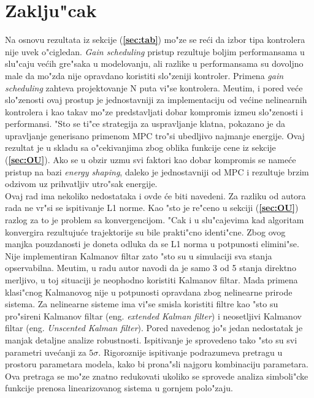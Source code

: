 \documentclass[a4paper,11pt]{article}
\theoremstyle{definition} \newtheorem{deff}{Definicija}[section]
\theoremstyle{definition} \newtheorem{prim}[deff]{Primer}
\theoremstyle{plain} \newtheorem{teor}[deff]{Teorema}
\begin{document}
	
	\clearpage
	\section{Zaklju"cak}\label{sec:zakljucak}
	
	Na osnovu rezultata iz sekcije (\textbf{\ref{sec:tab}}) mo"ze se re\'ci da  izbor tipa kontrolera nije uvek o"cigledan. \emph{Gain scheduling} pristup rezultuje boljim performansama u slu"caju ve\'cih gre"saka u modelovanju, ali razlike u performansama su dovoljno male da mo"zda nije opravdano koristiti slo"zeniji kontroler. Primena 
	\emph{gain scheduling} zahteva projektovanje N puta vi"se kontrolera. Me\dj utim, i pored ve\'ce slo"zenosti ovaj prostup je jednostavniji za implementaciju od ve\'cine nelinearnih kontrolera i kao takav mo"ze predstavljati dobar kompromis izme\dj u slo"zenosti i performansi. "Sto se ti"ce strategija za uspravljanje klatna, pokazano je da upravljanje generisano primenom MPC tro"si ubedljivo najmanje energije. Ovaj rezultat je u skladu sa o"cekivanjima zbog oblika funkcije cene iz sekcije (\textbf{\ref{sec:OU}}). Ako se u obzir uzmu svi faktori kao dobar kompromis se name\'ce pristup na bazi \emph{energy shaping}, daleko je jednostavniji od MPC i rezultuje brzim odzivom uz prihvatljiv utro"sak energije.  \\
	
	Ovaj rad ima nekoliko nedostataka i ovde \'ce biti navedeni. Za razliku od autora rada \cite{inicijalna} ne vr"si se ispitivanje L1 norme. Kao "sto je re"ceno u sekciji (\textbf{\ref{sec:OU}}) razlog za to je problem sa konvergencijom. "Cak i u slu"cajevima kad algoritam konvergira rezultuju\'ce trajektorije su bile prakti"cno identi"cne. Zbog ovog manjka pouzdanosti je doneta odluka da se L1 norma u potpunosti elimini"se. Nije implementiran Kalmanov filtar zato "sto su u simulaciji sva stanja opservabilna. Me\dj utim, u radu autor navodi da je samo 3 od 5 stanja direktno merljivo, u toj situaciji je neophodno koristiti Kalmanov filtar. Mada primena klasi"cnog Kalmanovog nije u potpunosti opravdana zbog nelinearne prirode sistema. Za nelinearne sisteme ima vi"se smisla koristiti filtre kao "sto su pro"sireni Kalmanov filtar (eng. \emph{extended Kalman filter}) i neosetljivi Kalmanov filtar (eng. \emph{Unscented Kalman filter}). Pored navedenog jo"s jedan nedostatak je manjak detaljne analize robustnosti. Ispitivanje je sprovedeno tako "sto su svi parametri uve\'canji za $5\sigma$. Rigoroznije ispitivanje podrazumeva pretragu u prostoru parametara modela, kako bi prona"sli najgoru kombinaciju parametara. Ova pretraga se mo"ze znatno redukovati ukoliko se sprovede analiza simboli"cke funkcije prenosa linearizovanog sistema u gornjem polo"zaju. \\
	
\end{document}
